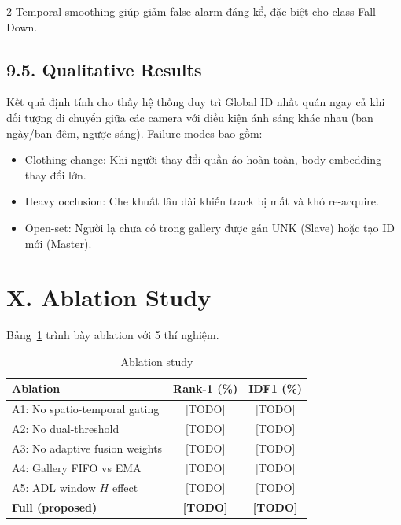 \documentclass[a4paper,13pt]{article}
\begin{document}
\begin{multicols}{2}
Temporal smoothing giúp giảm false alarm đáng kể, đặc biệt cho class Fall Down.

\subsection*{9.5. Qualitative Results}
Kết quả định tính cho thấy hệ thống duy trì Global ID nhất quán ngay cả khi đối tượng di chuyển giữa các camera với điều kiện ánh sáng khác nhau (ban ngày/ban đêm, ngược sáng). Failure modes bao gồm:
\begin{itemize}
    \item Clothing change: Khi người thay đổi quần áo hoàn toàn, body embedding thay đổi lớn.
    \item Heavy occlusion: Che khuất lâu dài khiến track bị mất và khó re-acquire.
    \item Open-set: Người lạ chưa có trong gallery được gán UNK (Slave) hoặc tạo ID mới (Master).
\end{itemize}

\section*{X. Ablation Study}

Bảng~\ref{tab:ablation} trình bày ablation với 5 thí nghiệm.

\begin{table}[H]
\centering
\caption{Ablation study}
\label{tab:ablation}
\fontsize{10}{12}\selectfont
\renewcommand{\arraystretch}{1.3}
\begin{tabular}{lcc}
\toprule
\textbf{Ablation} & \textbf{Rank-1 (\%)} & \textbf{IDF1 (\%)} \\
\midrule
A1: No spatio-temporal gating & [TODO] & [TODO] \\
A2: No dual-threshold & [TODO] & [TODO] \\
A3: No adaptive fusion weights & [TODO] & [TODO] \\
A4: Gallery FIFO vs EMA & [TODO] & [TODO] \\
A5: ADL window $H$ effect & [TODO] & [TODO] \\
\textbf{Full (proposed)} & \textbf{[TODO]} & \textbf{[TODO]} \\
\bottomrule
\end{tabular}
\end{table}


\end{multicols}
\end{document}
